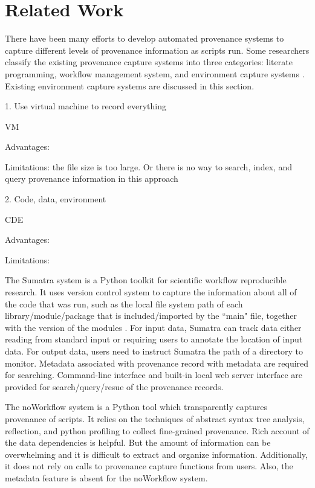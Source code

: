 \documentclass[runningheads,a4paper]{llncs}
\begin{document}
{\section{Related Work}  \label{related-work}

There have been many efforts to develop automated provenance systems to capture different levels of provenance information as scripts run. Some researchers classify the existing provenance capture systems into three categories: literate programming, workflow management system, and environment capture systems \cite{sumatra-impl}. Existing environment capture systems are discussed in this section.


1. Use virtual machine to record everything

VM

Advantages: 

Limitations: the file size is too large. Or there is no way to search, index, and query provenance information in this approach

2. Code, data, environment

CDE \cite{cde}

Advantages:

Limitations:



The Sumatra \cite{sumatra} system is a Python toolkit for scientific workflow reproducible research. It uses version control system to capture the information about all of the code that was run, such as the local file system path of each library/module/package that is included/imported by the ``main" file, together with the version of the modules \cite{sumatra-impl}. For input data, Sumatra can track data either reading from standard input or requiring users to annotate the location of input data. For output data, users need to instruct Sumatra the path of a directory to monitor. Metadata associated with provenance record with metadata are required for searching. Command-line interface and built-in local web server interface are provided for search/query/resue of the provenance records. 

The noWorkflow \cite{noworkflow} system is a Python tool which transparently captures provenance of scripts. It relies on the techniques of abstract syntax tree analysis, reflection, and python profiling to collect fine-grained provenance. Rich account of the data dependencies is helpful. But the amount of information can be overwhelming and it is difficult to extract and organize information. Additionally, it does not rely on calls to provenance capture functions from users. Also, the metadata feature is absent for the noWorkflow system.

}
\end{document}
